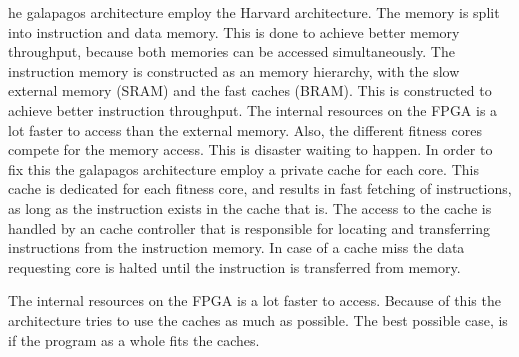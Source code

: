 he galapagos architecture employ the Harvard architecture. The memory is split into instruction and data memory. This is done to achieve better memory throughput, because both memories can be accessed simultaneously. The instruction memory is constructed as an memory hierarchy, with the slow external memory (SRAM) and the fast caches (BRAM). This is constructed to achieve better instruction throughput. The internal resources on the FPGA is a lot faster to access than the external memory. Also, the different fitness cores compete for the memory access. This is disaster waiting to happen. In order to fix this the galapagos architecture employ a private cache for each core. This cache is dedicated for each fitness core, and results in fast fetching of instructions, as long as the instruction exists in the cache that is.  The access to the cache is handled by an cache controller that is responsible for locating and transferring instructions from the instruction memory. In case of a cache miss the data requesting core is halted until the instruction is transferred from memory. 


The internal resources on the FPGA is a lot faster to access. Because of this the architecture tries to use the caches as much as possible. The best possible case, is if the program as a whole fits the caches.  

